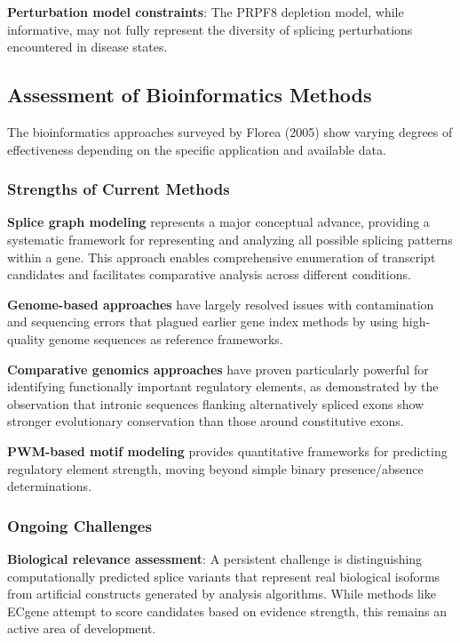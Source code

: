 \documentclass[12pt,a4paper]{article}
\begin{document}
\textbf{Perturbation model constraints}: The PRPF8 depletion model, while informative, may not fully represent the diversity of splicing perturbations encountered in disease states.

\subsection{Assessment of Bioinformatics Methods}

The bioinformatics approaches surveyed by Florea (2005) show varying degrees of effectiveness depending on the specific application and available data.

\subsubsection{Strengths of Current Methods}

\textbf{Splice graph modeling} represents a major conceptual advance, providing a systematic framework for representing and analyzing all possible splicing patterns within a gene. This approach enables comprehensive enumeration of transcript candidates and facilitates comparative analysis across different conditions.

\textbf{Genome-based approaches} have largely resolved issues with contamination and sequencing errors that plagued earlier gene index methods by using high-quality genome sequences as reference frameworks.

\textbf{Comparative genomics approaches} have proven particularly powerful for identifying functionally important regulatory elements, as demonstrated by the observation that intronic sequences flanking alternatively spliced exons show stronger evolutionary conservation than those around constitutive exons.

\textbf{PWM-based motif modeling} provides quantitative frameworks for predicting regulatory element strength, moving beyond simple binary presence/absence determinations.

\subsubsection{Ongoing Challenges}

\textbf{Biological relevance assessment}: A persistent challenge is distinguishing computationally predicted splice variants that represent real biological isoforms from artificial constructs generated by analysis algorithms. While methods like ECgene attempt to score candidates based on evidence strength, this remains an active area of development.
\end{document}
